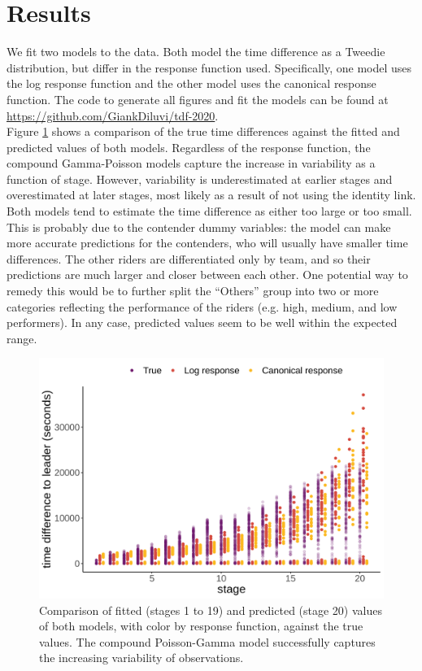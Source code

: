 \documentclass[aos,preprint]{imsart}
\begin{document}
\section{Results} \label{sec:results}


We fit two models to the data. Both model the time difference as a Tweedie distribution, but differ in the response function used. Specifically, one model uses the log response function and the other model uses the canonical response function. The code to generate all figures and fit the models can be found at \url{https://github.com/GiankDiluvi/tdf-2020}. \\


Figure \ref{fig:fitted_predicted} shows a comparison of the true time differences against the fitted and predicted values of both models. Regardless of the response function, the compound Gamma-Poisson models capture the increase in variability as a function of stage. However, variability is underestimated at earlier stages and overestimated at later stages, most likely as a result of not using the identity link. Both models tend to estimate the time difference as either too large or too small. This is probably due to the contender dummy variables: the model can make more accurate predictions for the contenders, who will usually have smaller time differences. The other riders are differentiated only by team, and so their predictions are much larger and closer between each other. One potential way to remedy this would be to further split the ``Others'' group into two or more categories reflecting the performance of the riders (e.g. high, medium, and low performers). In any case, predicted values seem to be well within the expected range. \\



\begin{figure}[h]
  \centering
  \includegraphics[scale=0.65]{fig/fitted_predicted_comparison.png}
  \caption{Comparison of fitted (stages 1 to 19) and predicted (stage 20) values of both models, with color by response function, against the true values. The compound Poisson-Gamma model successfully captures the increasing variability of observations.}
  \label{fig:fitted_predicted}
\end{figure}
\end{document}
